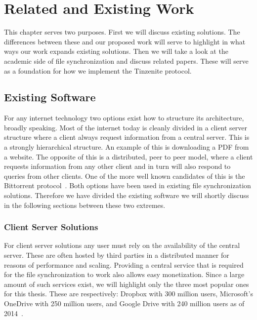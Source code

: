 \chapter{Related and Existing Work}
\label{chap:Related and Existing Work}

This chapter serves two purposes.
First we will discuss existing solutions.
The differences between these and our proposed work will serve to highlight in what ways our work expands existing solutions.
Then we will take a look at the academic side of file synchronization and discuss related papers.
These will serve as a foundation for how we implement the Tinzenite protocol.

\section{Existing Software}

For any internet technology two options exist how to structure its architecture, broadly speaking.
Most of the internet today is cleanly divided in a client server structure where a client always request information from a central server.
This is a strongly hierarchical structure.
An example of this is downloading a PDF from a website.
The opposite of this is a distributed, peer to peer model, where a client requests information from any other client and in turn will also respond to queries from other clients.
One of the more well known candidates of this is the Bittorrent protocol~\cite{web:site:bittorrent}.
Both options have been used in existing file synchronization solutions.
Therefore we have divided the existing software we will shortly discuss in the following sections between these two extremes.

\subsection{Client Server Solutions}

For client server solutions any user must rely on the availability of the central server.
These are often hosted by third parties in a distributed manner for reasons of performance and scaling.
Providing a central service that is required for the file synchronization to work also allows easy monetization.
Since a large amount of such services exist, we will highlight only the three most popular ones for this thesis.
These are respectively: Dropbox with 300 million users, Microsoft's OneDrive with 250 million users, and Google Drive with 240 million users as of 2014~\cite{web:site:fortune}.

